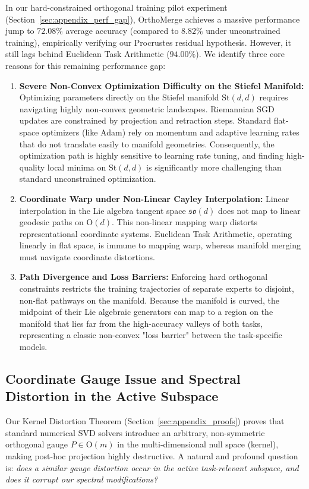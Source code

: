 In our hard-constrained orthogonal training pilot experiment (Section~\ref{sec:appendix_perf_gap}), OrthoMerge achieves a massive performance jump to $72.08\%$ average accuracy (compared to $8.82\%$ under unconstrained training), empirically verifying our Procrustes residual hypothesis. However, it still lags behind Euclidean Task Arithmetic ($94.00\%$). We identify three core reasons for this remaining performance gap:
\begin{enumerate}
    \item \textbf{Severe Non-Convex Optimization Difficulty on the Stiefel Manifold:} Optimizing parameters directly on the Stiefel manifold $\mathrm{St}(d, d)$ requires navigating highly non-convex geometric landscapes. Riemannian SGD updates are constrained by projection and retraction steps. Standard flat-space optimizers (like Adam) rely on momentum and adaptive learning rates that do not translate easily to manifold geometries. Consequently, the optimization path is highly sensitive to learning rate tuning, and finding high-quality local minima on $\mathrm{St}(d, d)$ is significantly more challenging than standard unconstrained optimization.
    \item \textbf{Coordinate Warp under Non-Linear Cayley Interpolation:} Linear interpolation in the Lie algebra tangent space $\mathfrak{so}(d)$ does not map to linear geodesic paths on $\mathrm{O}(d)$. This non-linear mapping warp distorts representational coordinate systems. Euclidean Task Arithmetic, operating linearly in flat space, is immune to mapping warp, whereas manifold merging must navigate coordinate distortions.
    \item \textbf{Path Divergence and Loss Barriers:} Enforcing hard orthogonal constraints restricts the training trajectories of separate experts to disjoint, non-flat pathways on the manifold. Because the manifold is curved, the midpoint of their Lie algebraic generators can map to a region on the manifold that lies far from the high-accuracy valleys of both tasks, representing a classic non-convex "loss barrier" between the task-specific models.
\end{enumerate}

\subsection{Coordinate Gauge Issue and Spectral Distortion in the Active Subspace}
\label{subsec:active_gauge}

Our Kernel Distortion Theorem (Section~\ref{sec:appendix_proofs}) proves that standard numerical SVD solvers introduce an arbitrary, non-symmetric orthogonal gauge $P \in \mathrm{O}(m)$ in the multi-dimensional null space (kernel), making post-hoc projection highly destructive. A natural and profound question is: \emph{does a similar gauge distortion occur in the active task-relevant subspace, and does it corrupt our spectral modifications?}

